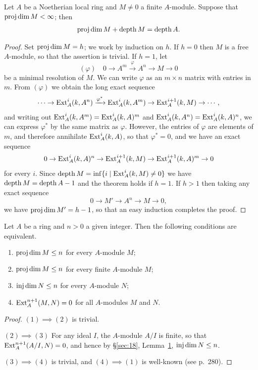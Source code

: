 \begin{theorem}\label{thm:19.1}
Let $A$ be a Noetherian local
ring and $M \neq 0$ a finite $A$-module. Suppose that $\operatorname{proj\,dim} M < \infty$; then
\[
  \operatorname{proj\,dim} M + \operatorname{depth} M = \operatorname{depth} A.
\]
\end{theorem}

\begin{proof}
Set $\operatorname{proj\,dim} M = h$; we work by induction on $h$. If $h = 0$ then $M$
is a free $A$-module, so that the assertion is trivial. If $h = 1$, let
\[
  (\varphi) \quad 0 \to A^m \xrightarrow{\varphi} A^n \to M \to 0
\]
be a minimal resolution of $M$. We can write $\varphi$ as an $m \times n$ matrix with
entries in $m$. From $(\varphi)$ we obtain the long exact sequence
\[
  \cdots \to \operatorname{Ext}^i_A(k, A^n) \xrightarrow{\varphi^*} \operatorname{Ext}^i_A(k, A^m) \to \operatorname{Ext}^{i+1}_A(k, M) \to \cdots,
\]
and writing out $\operatorname{Ext}^i_A(k, A^m) = \operatorname{Ext}^i_A(k, A)^m$ and $\operatorname{Ext}^i_A(k, A^n) = \operatorname{Ext}^i_A(k, A)^n$,
we can express $\varphi^*$ by the same matrix as $\varphi$. However, the entries of $\varphi$ are
elements of $m$, and therefore annihilate $\operatorname{Ext}^i_A(k, A)$, so that $\varphi^* = 0$, and we
have an exact sequence
\[
  0 \to \operatorname{Ext}^i_A(k, A)^n \to \operatorname{Ext}^{i+1}_A(k, M) \to \operatorname{Ext}^{i+1}_A(k, A)^m \to 0
\]
for every $i$. Since $\operatorname{depth} M = \inf \{i \mid \operatorname{Ext}^i_A(k, M) \neq 0\}$ we have $\operatorname{depth} M =
\operatorname{depth} A - 1$ and the theorem holds if $h = 1$. If $h > 1$ then taking any exact
sequence
\[
  0 \to M' \to A^n \to M \to 0,
\]
we have $\operatorname{proj\,dim} M' = h - 1$, so that an easy induction completes the
proof.
\end{proof}

\begin{lemma}\label{lem:19.2}
Let $A$ be a ring and $n > 0$ a given integer. Then the following
conditions are equivalent.
\begin{enumerate}[(1)]
  \item $\operatorname{proj\,dim} M \le n$ for every $A$-module $M$;
  \item $\operatorname{proj\,dim} M \le n$ for every finite $A$-module $M$;
  \item $\operatorname{inj\,dim} N \le n$ for every $A$-module $N$;
  \item $\operatorname{Ext}^{n+1}_A(M, N) = 0$ for all $A$-modules $M$ and $N$.
\end{enumerate}
\end{lemma}

\begin{proof}
$(1) \implies (2)$ is trivial.

$(2) \implies (3)$ For any ideal $I$, the $A$-module $A/I$ is finite, so that
$\operatorname{Ext}^{n+1}_A(A/I, N) = 0$, and hence by \S\ref{sec:18}, Lemma~\hyperref[lem:18.1]{1}, $\operatorname{inj\,dim} N \le n$.

$(3) \implies (4)$ is trivial, and $(4) \implies (1)$ is well-known (see p.~280).
\end{proof}

